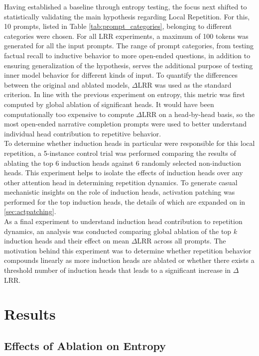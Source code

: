 \documentclass[twocolumn]{article}
\begin{document}
Having established a baseline through entropy testing, the focus next shifted to statistically validating the main hypothesis regarding Local Repetition. For this, 10 prompts, listed in Table \ref{tab:prompt_categories}, belonging to different categories were chosen. For all LRR experiments, a maximum of 100 tokens was generated for all the input prompts. The range of prompt categories, from testing factual recall to inductive behavior to more open-ended questions, in addition to ensuring generalization of the hypothesis, serves the additional purpose of testing inner model behavior for different kinds of input. To quantify the differences between the original and ablated models, $\Delta$LRR was used as the standard criterion. In line with the previous experiment on entropy, this metric was first computed by global ablation of significant heads. It would have been computationally too expensive to compute $\Delta$LRR on a head-by-head basis, so the most open-ended narrative completion prompts were used to better understand individual head contribution to repetitive behavior. \\

To determine whether induction heads in particular were responsible for this local repetition, a 5-instance control trial was performed comparing the results of ablating the top 6 induction heads against 6 randomly selected non-induction heads. This experiment helps to isolate the effects of induction heads over any other attention head in determining repetition dynamics. To generate casual mechanistic insights on the role of induction heads, activation patching was performed for the top induction heads, the details of which are expanded on in \ref{sec:actpatching}. \\

As a final experiment to understand induction head contribution to repetition dynamics, an analysis was conducted comparing global ablation of the top $k$ induction heads and their effect on mean $\Delta$LRR across all prompts. The motivation behind this experiment was to determine whether repetition behavior compounds linearly as more induction heads are ablated or whether there exists a threshold number of induction heads that leads to a significant increase in $\Delta$LRR.


\section{Results}
\subsection{Effects of Ablation on Entropy}
\end{document}

